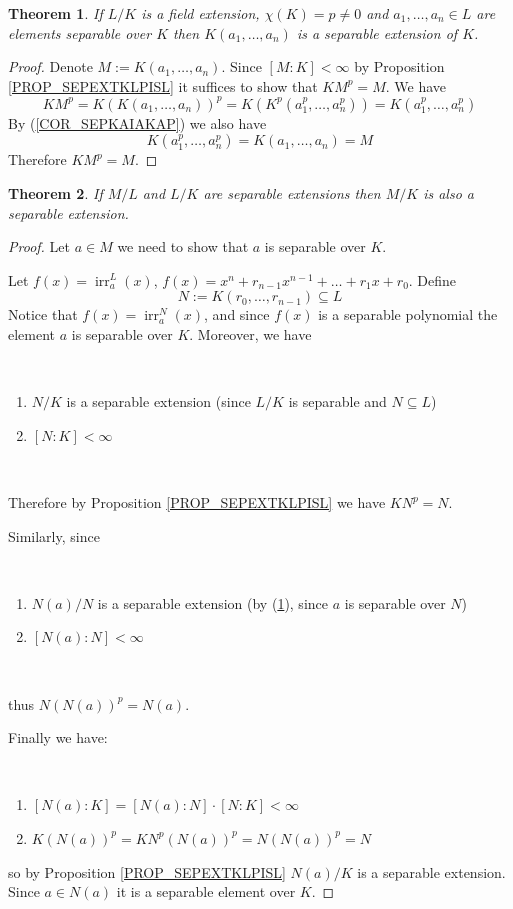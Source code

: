 \documentclass[12pt, letterpaper, oneside]{article}
\theoremstyle{plain}
\newtheorem{theorem}{Theorem}[section]
\theoremstyle{definition}
\newcommand{\irr}{\operatorname{irr}}
\newcommand{\benu}{\begin{enumerate}}
\newcommand{\eenu}{\end{enumerate}}
\newcommand{\vs}{\vskip 5mm}
\begin{document}
\vs\vs

\begin{theorem}
\label{THM_SEPEXTA1AN}
If $L/K$ is a field extension, $\chi(K) = p\neq 0$ and $a_{1}, \dots, a_{n}\in L$ 
are elements separable over $K$ then $K(a_{1}, \dots, a_{n})$ is a separable extension
of $K$. 
\end{theorem}

\vs

\begin{proof}
Denote $M:= K(a_{1}, \dots, a_{n})$.  Since $[M:K]<\infty$ by Proposition \ref{PROP_SEPEXTKLPISL}
it suffices to show that $KM^{p} = M$. We have 
$$KM^{p} = K(K(a_{1}, \dots, a_{n}))^{p} = K(K^{p}(a_{1}^{p}, \dots, a_{n}^{p})) = 
K(a_{1}^{p}, \dots, a_{n}^{p})$$
By (\ref{COR_SEPKAIAKAP}) we also have 
$$K(a_{1}^{p}, \dots, a_{n}^{p}) = K(a_{1}, \dots, a_{n}) = M$$
Therefore $KM^{p} = M$.
\end{proof}


\vs\vs

\begin{theorem}
If $M/L$ and $L/K$ are separable extensions then $M/K$ is also a separable extension.
\end{theorem}


\vs

\begin{proof}
Let $a\in M$ we need to show that $a$ is separable over $K$. 

Let $f(x) = \irr^{L}_{a}(x)$, $f(x) =  x^{n} + r_{n-1}x^{n-1} + {\dots} + r_{1}x + r_{0}$.
Define
$$N:= K(r_{0}, \dots, r_{n-1})\subseteq L$$
Notice that $f(x)= \irr^{N}_{a}(x)$, and since $f(x)$ is a separable polynomial 
the element $a$ is separable over $K$. Moreover, we have

\vskip -13mm

\ 
\benu 
\item $N/K$ is a separable extension (since $L/K$ is separable and $N\subseteq L$)
\item $[N:K]<\infty$
\eenu
\ 

\vskip -13mm

Therefore  by Proposition \ref{PROP_SEPEXTKLPISL} we have $KN^{p} = N$.

Similarly, since
\vskip -13mm

\ 
\benu 
\item $N(a)/N$ is a separable extension (by (\ref{THM_SEPEXTA1AN}), since $a$
is separable over $N$)
\item $[N(a):N]<\infty$
\eenu
\ 

\vskip -13mm

thus $N(N(a))^{p} = N(a)$.

 Finally we have:
\vskip -13mm

\ 
\benu 
\item $[N(a): K] = [N(a): N]\cdot [N:K] <\infty$
\item $K(N(a))^{p}= KN^{p}(N(a))^{p} = N(N(a))^{p} = N$
\eenu
so by Proposition \ref{PROP_SEPEXTKLPISL} $N(a)/K$ is a separable extension. 
Since $a\in N(a)$ it is a separable element over $K$.
\end{proof}
\end{document}
